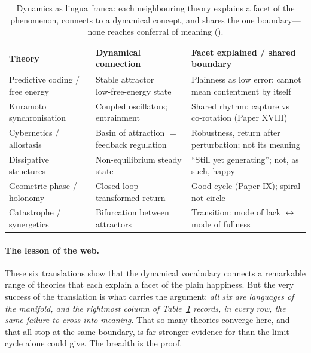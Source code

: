\begin{table}[t]
\caption{Dynamics as lingua franca: each neighbouring theory explains a facet of the phenomenon, connects to a dynamical concept, and shares the one boundary---none reaches conferral of meaning ().}
\label{p19:tab:dyn-connect}
\small
\begin{tabularx}{\linewidth}{>{\RaggedRight\arraybackslash}p{3.0cm} >{\RaggedRight\arraybackslash}p{3.2cm} >{\RaggedRight\arraybackslash}X}
\toprule
\textbf{Theory} & \textbf{Dynamical connection} & \textbf{Facet explained / shared boundary} \\
\midrule
Predictive coding / free energy & Stable attractor $=$ low-free-energy state & Plainness as low error; cannot mean contentment by itself \\
Kuramoto synchronisation & Coupled oscillators; entrainment & Shared rhythm; capture vs co-rotation (Paper XVIII) \\
Cybernetics / allostasis & Basin of attraction $=$ feedback regulation & Robustness, return after perturbation; not its meaning \\
Dissipative structures & Non-equilibrium steady state & ``Still yet generating''; not, as such, happy \\
Geometric phase / holonomy & Closed-loop transformed return & Good cycle (Paper IX); spiral not circle \\
Catastrophe / synergetics & Bifurcation between attractors & Transition: mode of lack $\leftrightarrow$ mode of fullness \\
\bottomrule
\end{tabularx}
\end{table}

\paragraph{The lesson of the web.} These six translations show that the dynamical vocabulary connects a remarkable range of theories that each explain a facet of the plain happiness. But the very success of the translation is what carries the argument: \emph{all six are languages of the manifold, and the rightmost column of Table~\ref{p19:tab:dyn-connect} records, in every row, the same failure to cross into meaning.} That so many theories converge here, and that all stop at the same boundary, is far stronger evidence for  than the limit cycle alone could give. The breadth is the proof.

